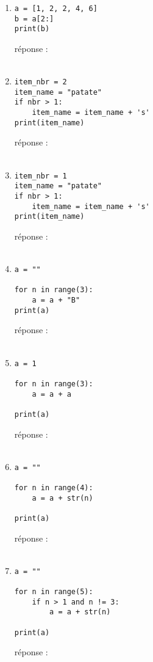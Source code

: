 \documentclass[12pt,a4paper]{article}
\newcommand{\response}{réponse : \hrulefill\\\\}
\begin{document}
\begin{enumerate}
\item
\begin{lstlisting}
a = [1, 2, 2, 4, 6]
b = a[2:]
print(b) 
\end{lstlisting}
\response %
\pagebreak

\item
\begin{lstlisting}
item_nbr = 2
item_name = "patate"
if nbr > 1:
	item_name = item_name + 's'
print(item_name)

\end{lstlisting}
\response %

\item
\begin{lstlisting}
item_nbr = 1
item_name = "patate"
if nbr > 1:
	item_name = item_name + 's'
print(item_name)

\end{lstlisting}
\response %

\item
\begin{lstlisting}
a = ""

for n in range(3):
	a = a + "B"
print(a)
\end{lstlisting}
\response %

\item
\begin{lstlisting}
a = 1

for n in range(3):
	a = a + a

print(a)
\end{lstlisting}
\response %

\pagebreak
\item
\begin{lstlisting}
a = ""

for n in range(4):
	a = a + str(n)
	
print(a)
\end{lstlisting}
\response %

\item
\begin{lstlisting}
a = ""

for n in range(5):
	if n > 1 and n != 3: 
		a = a + str(n)
	
print(a)
\end{lstlisting}
\response %

\end{enumerate}
\end{document}
